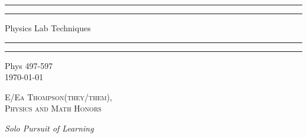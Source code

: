 \documentclass[12pt, a4paper, oneside, openright, titlepage]{book}
\begin{document}

\begin{titlepage}
    \centering
    \scshape
    \vspace*{\baselineskip}
    \rule{\textwidth}{1.6pt}\vspace*{-\baselineskip}\vspace*{2pt}
    \rule{\textwidth}{0.4pt}
    
    \vspace{0.75\baselineskip}
    
    {\LARGE Physics Lab Techniques}
    
    \vspace{0.75\baselineskip}
    
    \rule{\textwidth}{0.4pt}\vspace*{-\baselineskip}\vspace{3.2pt}
    \rule{\textwidth}{1.6pt}
    
    \vspace{2\baselineskip}
    Phys 497-597 \\
    \vspace*{3\baselineskip}
    \monthdayyeardate\today \\
    \vspace*{5.0\baselineskip}
    
    {\scshape\Large E/Ea Thompson(they/them), \\ Physics and Math Honors\\}
    
    \vspace{1.0\baselineskip}
    \textit{Solo Pursuit of Learning}
    \vfill
    \enlargethispage{1in}
    \begin{figure}[b!]
    \end{figure}
\end{titlepage}
\end{document}
